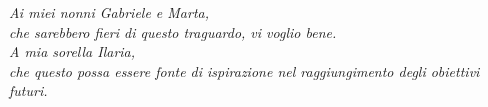     



\thispagestyle{empty}
\vspace*{6.5cm}
\begin{flushright}
    \emph{
    Ai miei nonni Gabriele e Marta,\\
    che sarebbero fieri di questo traguardo, vi voglio bene.\\[0.5cm]    
    A mia sorella Ilaria,\\
    che questo possa essere fonte di ispirazione nel raggiungimento degli obiettivi futuri.
    }
\end{flushright}